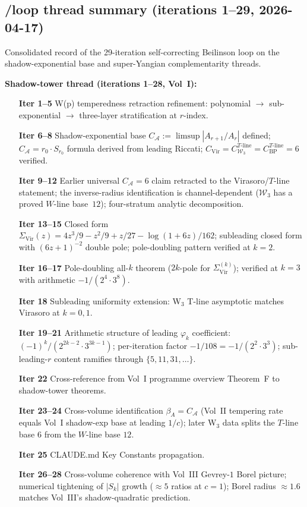 \documentclass[11pt]{article}
\newcommand{\cA}{\mathcal{A}}
\newcommand{\cW}{\mathcal{W}}
\begin{document}
\subsection{/loop thread summary (iterations 1--29, 2026-04-17)}
\label{subsec:loop-thread-summary-2026-04-17}

Consolidated record of the 29-iteration self-correcting Beilinson
loop on the shadow-exponential base and super-Yangian
complementarity threads.

\textbf{Shadow-tower thread (iterations 1--28, Vol~I):}
\begin{enumerate}
  \item[\textbf{Iter 1--5}] W(p) temperedness retraction refinement:
        polynomial $\to$ sub-exponential $\to$ three-layer
        stratification at $r$-index.
  \item[\textbf{Iter 6--8}] Shadow-exponential base $C_\cA :=
        \limsup|A_{r+1}/A_r|$ defined; $C_\cA = r_0 \cdot S_{r_0}$
        formula derived from leading Riccati; $C_{\mathrm{Vir}} =
        C_{\cW_3}^{T\text{-line}} = C_{\mathrm{BP}}^{T\text{-line}} = 6$
        verified.
  \item[\textbf{Iter 9--12}] Earlier universal $C_\cA=6$ claim
        retracted to the Virasoro/$T$-line statement; the
        inverse-radius identification is channel-dependent
        ($\cW_3$ has a proved $W$-line base~$12$);
        four-stratum analytic decomposition.
  \item[\textbf{Iter 13--15}] Closed form
        $\Sigma_{\mathrm{Vir}}(z) = 4z^3/9 - z^2/9 + z/27 - \log(1+6z)/162$;
        subleading closed form with $(6z+1)^{-2}$ double pole;
        pole-doubling pattern verified at $k = 2$.
  \item[\textbf{Iter 16--17}] Pole-doubling all-$k$ theorem
        ($2k$-pole for $\Sigma_{\mathrm{Vir}}^{(k)}$); verified at $k = 3$
        with arithmetic $-1/(2^4 \cdot 3^8)$.
  \item[\textbf{Iter 18}] Subleading uniformity extension: W$_3$
        T-line asymptotic matches Virasoro at $k = 0, 1$.
  \item[\textbf{Iter 19--21}] Arithmetic structure of leading
        $\varphi_k$ coefficient: $(-1)^k/(2^{2k-2} \cdot 3^{3k-1})$;
        per-iteration factor $-1/108 = -1/(2^2 \cdot 3^3)$;
        sub-leading-$r$ content ramifies through $\{5, 11, 31,
        \ldots\}$.
  \item[\textbf{Iter 22}] Cross-reference from Vol~I programme
        overview Theorem~F to shadow-tower theorems.
  \item[\textbf{Iter 23--24}] Cross-volume identification $\beta_A
        = C_\cA$ (Vol~II tempering rate equals Vol~I shadow-exp
        base at leading $1/c$); later W$_3$ data splits the
        $T$-line base $6$ from the $W$-line base $12$.
  \item[\textbf{Iter 25}] CLAUDE.md Key Constants propagation.
  \item[\textbf{Iter 26--28}] Cross-volume coherence with Vol~III
        Gevrey-$1$ Borel picture; numerical tightening of
        $|S_k|$ growth ($\approx 5$ ratios at $c = 1$); Borel radius
        $\approx 1.6$ matches Vol~III's shadow-quadratic prediction.
\end{enumerate}
\end{document}
